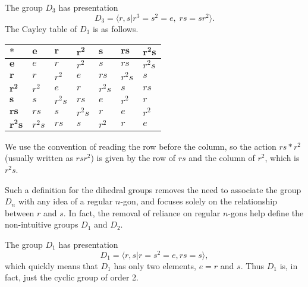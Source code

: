 \begin{example}\label{example-presentation-of-D3}
    The group $D_3$ has presentation
    \[
        D_3 = \langle r, s \vert r^3 = s^2 = e,\;rs = sr^2 \rangle.
    \]
    The Cayley table of $D_3$ is as follows.

    \begin{table}[H]
        \centering
        \begin{tabular}{|l|l|l|l|l|l|l|}
        \hline
        $\boldsymbol{\ast}$ & $\boldsymbol{e}$ & $\boldsymbol{r}$ & $\boldsymbol{r^2}$ & $\boldsymbol{s}$ & $\boldsymbol{rs}$ & $\boldsymbol{r^2s}$ \\ \hline
        $\boldsymbol{e}$    & $e$    & $r$    & $r^2$  & $s$    & $rs$   & $r^2s$ \\ \hline
        $\boldsymbol{r}$    & $r$    & $r^2$  & $e$    & $rs$   & $r^2s$ & $s$    \\ \hline
        $\boldsymbol{r^2}$  & $r^2$  & $e$    & $r$    & $r^2s$ & $s$    & $rs$   \\ \hline
        $\boldsymbol{s}$    & $s$    & $r^2s$ & $rs$   & $e$    & $r^2$  & $r$    \\ \hline
        $\boldsymbol{rs}$   & $rs$   & $s$    & $r^2s$ & $r$    & $e$    & $r^2$  \\ \hline
        $\boldsymbol{r^2s}$ & $r^2s$ & $rs$   & $s$    & $r^2$  & $r$    & $e$    \\ \hline
        \end{tabular}
    \end{table}

    We use the convention of reading the row before the column, so the action $rs \ast r^2$ (usually written as $rsr^2$) is given by the row of $rs$ and the column of $r^2$, which is $r^2s$.
\end{example}

Such a definition for the dihedral groups removes the need to associate the group $D_n$ with any idea of a regular $n$-gon, and focuses solely on the relationship between $r$ and $s$. In fact, the removal of reliance on regular $n$-gons help define the non-intuitive groups $D_1$ and $D_2$.
\begin{example}
    The group $D_1$ has presentation
    \[
        D_1 = \langle r, s \vert r = s^2 = e, rs = s \rangle,
    \]
    which quickly means that $D_1$ has only two elements, $e = r$ and $s$. Thus $D_1$ is, in fact, just the cyclic group of order 2.
\end{example}

